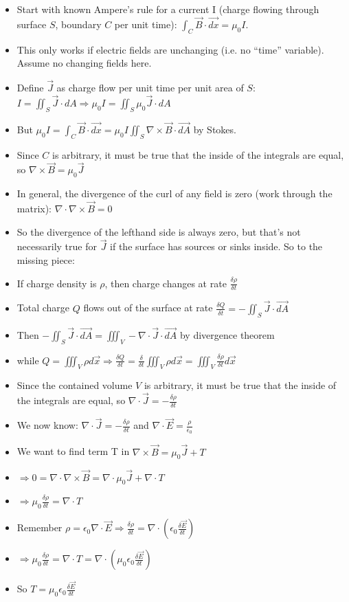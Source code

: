 \documentclass[11pt, oneside]{article}   	%
\begin{document}
\begin{itemize}
\item Start with known Ampere's rule for a current I (charge flowing through surface $S$, boundary $C$ per unit time): $\int_C \vec{B} \cdot \vec{dx} = \mu_0I$.
\item This only works if electric fields are unchanging (i.e. no ``time'' variable).  Assume no changing fields here.
\item Define $\vec{J}$ as charge flow per unit time per unit area of $S$: $I = \iint_S \vec{J} \cdot {dA} \Rightarrow \mu_0I =  \iint_S \mu_0 \vec{J} \cdot {dA}$
\item But $\mu_0I =  \int_C \vec{B} \cdot \vec{dx} = \mu_0I \iint_S \nabla \times \vec{B} \cdot \vec{dA}$ by Stokes.
\item Since $C$ is arbitrary, it must be true that the inside of the integrals are equal, so $\nabla \times \vec{B}  = \mu_0 \vec{J}$
\item In general, the divergence of the curl of any field is zero (work through the matrix): $\nabla \cdot \nabla \times \vec{B} = 0$
\item So the divergence of the lefthand side is always zero, but that's not necessarily true for $\vec{J}$ if the surface has sources or sinks inside.  So to the missing piece:
\item If charge density is $\rho$, then charge changes at rate $\frac{\delta \rho}{\delta t}$
\item Total charge $Q$ flows out of the surface at rate $\frac{\delta Q}{\delta t} = -\iint_S \vec{J} \cdot \vec{dA}$
\item Then  $-\iint_S \vec{J} \cdot \vec{dA} = \iiint_V -\nabla \cdot \vec{J} \cdot \vec{dA}$ by divergence theorem
\item while $Q = \iiint_V  \rho d\vec{x} \Rightarrow  \frac{\delta Q}{\delta t}  =  \frac{\delta}{\delta t} \iiint_V \rho d\vec{x}= \iiint_V  \frac{\delta \rho}{\delta t}  d\vec{x} $\
\item Since the contained volume $V$ is arbitrary, it must be true that the inside of the integrals are equal, so $\nabla \cdot \vec{J} =- \frac{\delta \rho}{\delta t}$
\item We now know: $\nabla \cdot \vec{J} =- \frac{\delta \rho}{\delta t}$ and $\nabla \cdot \vec{E} = \frac{\rho}{\epsilon_0}$
\item We want to find term T  in $\nabla \times \vec{B} = \mu_0\vec{J} + T$
\item $\Rightarrow 0 = \nabla \cdot \nabla \times \vec{B} = \nabla \cdot \mu_0\vec{J} + \nabla \cdot T$
\item $\Rightarrow  \mu_0\frac{\delta \rho}{\delta t} =  \nabla \cdot T$
\item Remember $\rho = \epsilon_0 \nabla \cdot \vec{E} \Rightarrow \frac{\delta \rho}{\delta t} = \nabla \cdot (\epsilon_0  \frac{\delta \vec{E}}{\delta t})$
\item $\Rightarrow  \mu_0\frac{\delta \rho}{\delta t} = \nabla \cdot T =  \nabla \cdot (\mu_0 \epsilon_0  \frac{\delta \vec{E}}{\delta t})$
\item So $T = \mu_0 \epsilon_0  \frac{\delta \vec{E}}{\delta t}$


\end{itemize}
\end{document}
